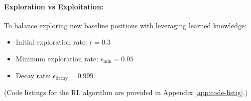 \paragraph*{Exploration vs Exploitation:}

To balance exploring new baseline positions with leveraging learned knowledge:

\begin{itemize}
    \item Initial exploration rate: $\epsilon = 0.3$
    \item Minimum exploration rate: $\epsilon_{\text{min}} = 0.05$
    \item Decay rate: $\epsilon_{\text{decay}} = 0.999$
\end{itemize}

(Code listings for the RL algorithm are provided in Appendix \ref{app:code-listig}.)


